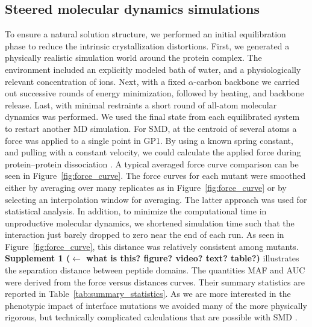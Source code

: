 \documentclass[12pt]{article}
\begin{document}
\subsection*{Steered molecular dynamics simulations}
To ensure a natural solution structure, we performed an initial equilibration phase to reduce the intrinsic crystallization distortions. First, we generated a physically realistic simulation world around the protein complex. The environment included an explicitly modeled bath of water, and a physiologically relevant concentration of ions. Next, with a fixed $\alpha$-carbon backbone we carried out successive rounds of energy minimization, followed by heating, and backbone release. Last,  with minimal restraints a short round of all-atom molecular dynamics \citep{Cuendet2008} was performed. We used the final state from each equilibrated system to restart another MD simulation. For SMD, at the centroid of several atoms a force was applied to a single point in GP1. By using a known spring constant, and pulling with a constant velocity, we could calculate the applied force during protein--protein dissociation \citep{Cuendet2008,Cuendet2011}. A typical averaged force curve comparison can be seen in Figure~\ref{fig:force_curve}. The force curves for each mutant were smoothed either by averaging over many replicates as in Figure~\ref{fig:force_curve} or by selecting an interpolation window for averaging. The latter approach was used for statistical analysis. In addition, to minimize the computational time in unproductive molecular dynamics, we shortened simulation time such that the interaction just barely dropped to zero near the end of each run. As seen in Figure~\ref{fig:force_curve}, this distance was relatively consistent among mutants. \textbf{Supplement 1 ($\leftarrow$ what is this? figure? video? text? table?)} illustrates the separation distance between peptide domains. The quantities MAF and AUC were derived from the force versus distances curves. Their summary statistics are reported in Table~\ref{tab:summary_statistics}. As we are more interested in the phenotypic impact of interface mutations we avoided many of the more physically rigorous, but technically complicated calculations that are possible with SMD \citep{Is2001A,Is2001B}.
\end{document}

